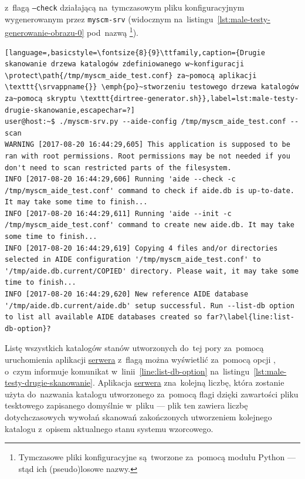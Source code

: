 \documentclass[thesis]{subfiles}
\begin{document}
z~flagą \texttt{--check} działającą na~tymczasowym pliku konfiguracyjnym wygenerowanym przez \texttt{myscm-srv} (widocznym na~listingu~\ref{lst:male-testy-generowanie-obrazu-0} pod~nazwą \footnote{Tymczasowe pliki konfiguracyjne są~tworzone za~pomocą modułu Python  --- stąd ich (pseudo)losowe nazwy.}).

\begin{lstlisting}[language=,basicstyle=\fontsize{8}{9}\ttfamily,caption={Drugie skanowanie drzewa katalogów zdefiniowanego w~konfiguracji \protect\path{/tmp/myscm_aide_test.conf} za~pomocą aplikacji \texttt{\srvappname{}} \emph{po}~stworzeniu testowego drzewa katalogów za~pomocą skryptu \texttt{dirtree-generator.sh}},label=lst:male-testy-drugie-skanowanie,escapechar=?]
user@host:~$ ./myscm-srv.py --aide-config /tmp/myscm_aide_test.conf --scan
WARNING [2017-08-20 16:44:29,605] This application is supposed to be ran with root permissions. Root permissions may be not needed if you don't need to scan restricted parts of the filesystem.
INFO [2017-08-20 16:44:29,606] Running 'aide --check -c /tmp/myscm_aide_test.conf' command to check if aide.db is up-to-date. It may take some time to finish...
INFO [2017-08-20 16:44:29,611] Running 'aide --init -c /tmp/myscm_aide_test.conf' command to create new aide.db. It may take some time to finish...
INFO [2017-08-20 16:44:29,619] Copying 4 files and/or directories selected in AIDE configuration '/tmp/myscm_aide_test.conf' to '/tmp/aide.db.current/COPIED' directory. Please wait, it may take some time to finish...
INFO [2017-08-20 16:44:29,620] New reference AIDE database '/tmp/aide.db.current/aide.db' setup successful. Run --list-db option to list all available AIDE databases created so far?\label{line:list-db-option}?
\end{lstlisting}

Listę wszystkich katalogów stanów utworzonych do~tej pory za~pomocą uruchomienia aplikacji \hyperref[sec:srv-app]{serwera} z~flagą  można wyświetlić za~pomocą opcji , o~czym informuje komunikat w~linii~\ref{line:list-db-option} na~listingu~\ref{lst:male-testy-drugie-skanowanie}. Aplikacja \hyperref[sec:srv-app]{serwera} zna~kolejną liczbę, która zostanie użyta do~nazwania katalogu utworzonego za~pomocą flagi  dzięki zawartości pliku tesktowego zapisanego domyślnie w~pliku  --- plik ten zawiera liczbę dotychczasowych wywołań skanowań zakończonych utworzeniem kolejnego katalogu z~opisem aktualnego stanu systemu wzorcowego.
\end{document}
